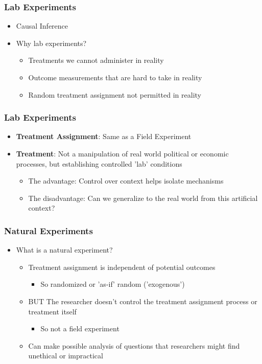 \documentclass[xcolor=x11names,compress]{beamer}\usepackage[]{graphicx}\usepackage[]{color}
\renewcommand{\(}{\begin{columns}}
\renewcommand{\)}{\end{columns}}
\newcommand{\<}[1]{\begin{column}{#1}}
\renewcommand{\>}{\end{column}}
\begin{document}
\begin{frame}
\frametitle{Lab Experiments}
\begin{itemize}
\item Causal Inference
\pause
\item Why lab experiments?
\pause
\begin{itemize}
\item Treatments we cannot administer in reality
\item Outcome measurements that are hard to take in reality
\item Random treatment assignment not permitted in reality
\end{itemize}
\end{itemize}
\end{frame}

\begin{frame}
\frametitle{Lab Experiments}
\begin{itemize}
\item \textbf{Treatment Assignment}: Same as a Field Experiment
\pause
\item \textbf{Treatment}: Not a manipulation of real world political or economic processes, but establishing controlled 'lab' conditions
\pause
\begin{itemize}
\item The advantage: Control over context helps isolate mechanisms
\item The disadvantage: Can we generalize to the real world from this artificial context?
\end{itemize}
\end{itemize}
\end{frame}

\begin{frame}
\frametitle{Natural Experiments}
\begin{itemize}
\item What is a natural experiment?
\pause
\begin{itemize}
\item Treatment assignment is independent of potential outcomes
\begin{itemize}
\item So randomized or 'as-if' random ('exogenous')
\end{itemize}
\pause
\item BUT The researcher doesn't control the treatment assignment process or treatment itself
\begin{itemize}
\item So not a field experiment
\end{itemize}
\item Can make possible analysis of questions that researchers might find unethical or impractical
\end{itemize}
\end{itemize}
\end{frame}
\end{document}
